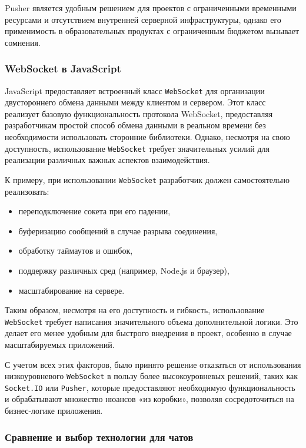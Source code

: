 Pusher является удобным решением для проектов с ограниченными временными ресурсами и отсутствием внутренней серверной инфраструктуры, однако его применимость в образовательных продуктах с ограниченным бюджетом вызывает сомнения.

\subsubsection*{WebSocket в JavaScript}

JavaScript предоставляет встроенный класс \texttt{WebSocket} для организации двустороннего обмена данными между клиентом и сервером. Этот класс реализует базовую функциональность протокола WebSocket, предоставляя разработчикам простой способ обмена данными в реальном времени без необходимости использовать сторонние библиотеки. Однако, несмотря на свою доступность, использование \texttt{WebSocket} требует значительных усилий для реализации различных важных аспектов взаимодействия.

К примеру, при использовании \texttt{WebSocket} разработчик должен самостоятельно реализовать:
\begin{itemize}
    \item переподключение сокета при его падении,
    \item буферизацию сообщений в случае разрыва соединения,
    \item обработку таймаутов и ошибок,
    \item поддержку различных сред (например, Node.js и браузер),
    \item масштабирование на сервере.
\end{itemize}

Таким образом, несмотря на его доступность и гибкость, использование \texttt{WebSocket} требует написания значительного объема дополнительной логики. Это делает его менее удобным для быстрого внедрения в проект, особенно в случае масштабируемых приложений.

С учетом всех этих факторов, было принято решение отказаться от использования низкоуровневого \texttt{WebSocket} в пользу более высокоуровневых решений, таких как \texttt{Socket.IO} или \texttt{Pusher}, которые предоставляют необходимую функциональность и обрабатывают множество нюансов «из коробки», позволяя сосредоточиться на бизнес-логике приложения.

\subsubsection*{Сравнение и выбор технологии для чатов}

